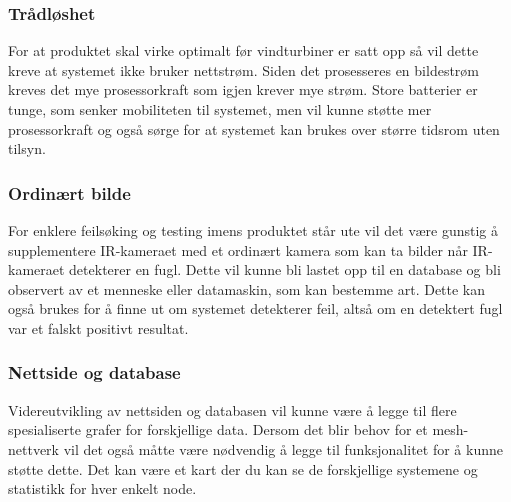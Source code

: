 \subsubsection{Trådløshet}
For at produktet skal virke optimalt før vindturbiner er satt opp så vil dette kreve at systemet ikke bruker nettstrøm. Siden det prosesseres en bildestrøm kreves det mye prosessorkraft som igjen krever mye strøm. Store batterier er tunge, som senker mobiliteten til systemet, men vil kunne støtte mer prosessorkraft og også sørge for at systemet kan brukes over større tidsrom uten tilsyn.


\subsubsection{Ordinært bilde}

For enklere feilsøking og testing imens produktet står ute vil det være gunstig å supplementere IR-kameraet med et ordinært kamera som kan ta bilder når IR-kameraet detekterer en fugl. Dette vil kunne bli lastet opp til en database og bli observert av et menneske eller datamaskin, som kan bestemme art. Dette kan også brukes for å finne ut om systemet detekterer feil, altså om en detektert fugl var et falskt positivt resultat.

\subsubsection{Nettside og database}

Videreutvikling av nettsiden og databasen vil kunne være å legge til flere spesialiserte grafer for forskjellige data. Dersom det blir behov for et mesh-nettverk vil det også måtte være nødvendig å legge til funksjonalitet for å kunne støtte dette. Det kan være et kart der du kan se de forskjellige systemene og statistikk for hver enkelt node. 

